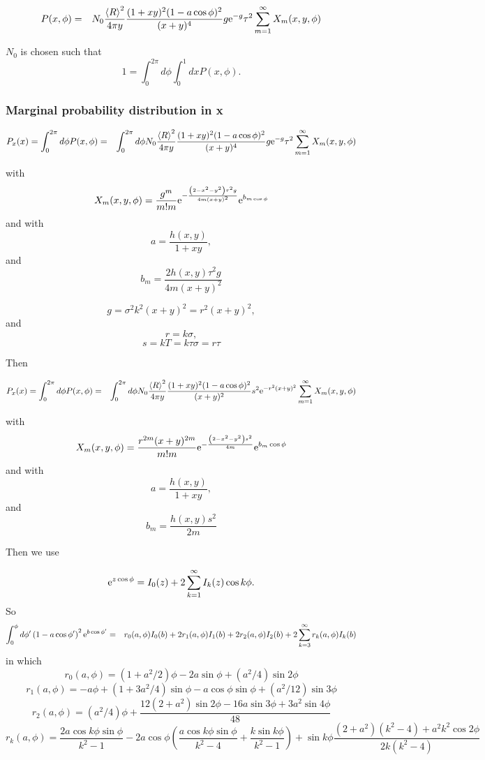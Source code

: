 \documentclass[11pt]{article}
\newcommand{\e}{{\rm e}}
\begin{document}
{{{{\begin{eqnarray}
 P(x,\phi)&=&
N_{0}\frac{\left<R\right>^{2}}{4\pi y}\frac{(1+xy)^{2}(1-a\cos\phi)^{2}}{(x+y)^{4}}g\e^{-g}\tau^{2}\sum_{m=1}^{\infty}X_{m}(x,y,\phi)
\end{eqnarray}

$N_{0}$ is chosen such that
$$1=\int_{0}^{2\pi}d\phi\int_{0}^{1}dxP(x,\phi).$$



\subsubsection{Marginal probability distribution in x}

\begin{eqnarray}
P_{x}(x)=\int_{0}^{2\pi}d\phi P(x,\phi)&=&
\int_{0}^{2\pi}d\phi N_{0}\frac{\left<R\right>^{2}}{4\pi y}\frac{(1+xy)^{2}(1-a\cos\phi)^{2}}{(x+y)^{4}}g\e^{-g}\tau^{2}\sum_{m=1}^{\infty}X_{m}(x,y,\phi)
\end{eqnarray}

with
$$X_{m}(x,y,\phi)=\frac{g^{m}}{m!m}\e^{-\frac{\left(2-x^{2}-y^{2}\right)\tau^{2}g}{4m(x+y)^{2}}}\e^{b_{m\cos\phi}}$$
and
with
$$a=\frac{h(x,y)}{1+xy},$$
and
$$b_{m}=\frac{2h(x,y)\tau^{2}g}{4m(x+y)^{2}}$$


$$g=\sigma^{2}k^{2}(x+y)^{2}=r^{2}(x+y)^{2},$$ and $$r=k\sigma,$$ $$s=kT=k\tau\sigma=r\tau$$


Then

\begin{eqnarray}
P_{x}(x)=\int_{0}^{2\pi}d\phi P(x,\phi)&=&
\int_{0}^{2\pi}d\phi N_{0}\frac{\left<R\right>^{2}}{4\pi y}\frac{(1+xy)^{2}(1-a\cos\phi)^{2}}{(x+y)^{2}}s^{2}\e^{-r^{2}(x+y)^{2}}\sum_{m=1}^{\infty}X_{m}(x,y,\phi)
\end{eqnarray}

with
$$X_{m}(x,y,\phi)=\frac{r^{2m}(x+y)^{2m}}{m!m}\e^{-\frac{\left(2-x^{2}-y^{2}\right)s^{2}}{4m}}\e^{b_{m}\cos\phi}$$
and
with
$$a=\frac{h(x,y)}{1+xy},$$
and
$$b_{m}=\frac{h(x,y)s^{2}}{2m}$$



Then we use

$$\e^{z\cos\phi}=I_{0}(z)+2\sum_{k=1}^{\infty}I_{k}(z)\cos k\phi.$$
So
\begin{eqnarray}
\int_{0}^{\phi}d\phi'\left(1-a\cos\phi' \right)^{2}\e^{b\cos\phi'}&=&
r_{0}(a,\phi)I_{0}(b)+2r_{1}(a,\phi)I_{1}(b)+2r_{2}(a,\phi)I_{2}(b)+2\sum_{k=3}^{\infty}r_{k}(a,\phi)I_{k}(b)
\end{eqnarray}
in which
$$r_{0}(a,\phi)=(1+a^{2}/2)\phi-2a\sin\phi+(a^{2}/4)\sin2\phi$$
$$r_{1}(a,\phi)=-a\phi+(1+3a^{2}/4)\sin\phi-a\cos\phi\sin\phi+(a^{2}/12)\sin3\phi$$
$$r_{2}(a,\phi)=(a^{2}/4)\phi+\frac{12(2+a^{2})\sin2\phi-16a\sin3\phi+3a^{2}\sin4\phi}{48}$$
$$r_{k}(a,\phi)=\frac{2a\cos k\phi\sin\phi}{k^{2}-1}-2a\cos\phi\left(\frac{a\cos k\phi\sin\phi}{k^{2}-4}+\frac{k\sin k\phi}{k^{2}-1}\right)+\sin k\phi\frac{(2+a^{2})(k^{2}-4)+a^{2}k^{2}\cos2\phi}{2k(k^{2}-4)}$$

}}}}
\end{document}
